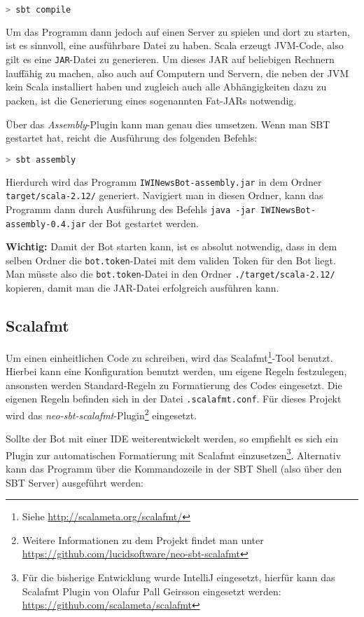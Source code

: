 \begin{lstlisting}[language=bash]
> sbt compile
\end{lstlisting}

Um das Programm dann jedoch auf einen Server zu spielen und dort zu starten, ist es sinnvoll, eine ausführbare Datei zu haben. Scala erzeugt JVM-Code, also gilt es eine \texttt{JAR}-Datei zu generieren. Um dieses JAR auf beliebigen Rechnern lauffähig zu machen, also auch auf Computern und Servern, die neben der JVM kein Scala installiert haben und zugleich auch alle Abhängigkeiten dazu zu packen, ist die Generierung eines sogenannten Fat-JARs notwendig.

Über das \emph{Assembly}-Plugin kann man genau dies umsetzen. Wenn man SBT gestartet hat, reicht die Ausführung des folgenden Befehls:

\begin{lstlisting}[language=bash]
> sbt assembly
\end{lstlisting}

Hierdurch wird das Programm \texttt{IWINewsBot\allowbreak-assembly\allowbreak.jar} in dem Ordner \texttt{target\allowbreak/scala-2.12/} generiert. Navigiert man in diesen Ordner, kann das Programm dann durch Ausführung des Befehls \texttt{java -jar IWINewsBot-assembly-0.4.jar} der Bot gestartet werden.

\textbf{Wichtig:} Damit der Bot starten kann, ist es absolut notwendig, dass in dem selben Ordner die \texttt{bot.token}-Datei mit dem validen Token für den Bot liegt. Man müsste also die \texttt{bot.token}-Datei in den Ordner \texttt{./target/scala-2.12/} kopieren, damit man die JAR-Datei erfolgreich ausführen kann.

\subsection{Scalafmt}
Um einen einheitlichen Code zu schreiben, wird das Scalafmt\footnote{Siehe \url{http://scalameta.org/scalafmt/}}-Tool benutzt. Hierbei kann eine Konfiguration benutzt werden, um eigene Regeln festzulegen, ansonsten werden Standard-Regeln zu Formatierung des Codes eingesetzt. Die eigenen Regeln befinden sich in der Datei \texttt{.scalafmt.conf}. Für dieses Projekt wird das \emph{neo-sbt-scalafmt}-Plugin\footnote{Weitere Informationen zu dem Projekt findet man unter \url{https://github.com/lucidsoftware/neo-sbt-scalafmt}} eingesetzt.

Sollte der Bot mit einer IDE weiterentwickelt werden, so empfiehlt es sich ein Plugin zur automatischen Formatierung mit Scalafmt einzusetzen\footnote{Für die bisherige Entwicklung wurde IntelliJ eingesetzt, hierfür kann das Scalafmt Plugin von Olafur Pall Geirsson eingesetzt werden: \url{https://github.com/scalameta/scalafmt}}. Alternativ kann das Programm über die Kommandozeile in der SBT Shell (also über den SBT Server) ausgeführt werden:


